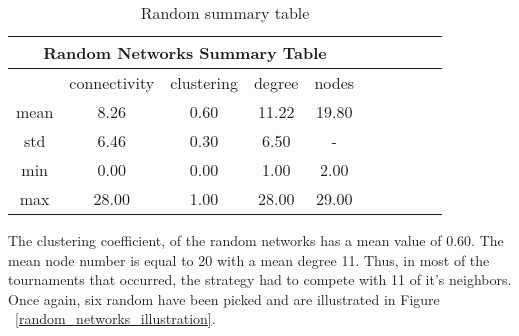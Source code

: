 \begin{table}[H]
	\centering
	\begin{adjustbox}{width=0.5\textwidth}
		\small
		\begin{tabular}{cccccccccc}
				\toprule
			\multicolumn{5}{|c|}{Random Networks Summary Table}                       \\ \hline
			     & connectivity & clustering & degree & nodes                  \\ \hline
			mean & 8.26         & 0.60       & 11.22  & 19.80                  \\ \hline
			std  & 6.46         & 0.30       & 6.50   & \multicolumn{1}{c}{-} \\ \hline
			min  & 0.00         & 0.00       & 1.00   & 2.00                   \\ \hline
			max  & 28.00        & 1.00       & 28.00  & 29.00                  \\ \bottomrule
		\end{tabular}
	\end{adjustbox}
	\caption{Random summary table}
	\label{table:binomial-summary-table}
\end{table}

The clustering coefficient, of the random networks has a mean value of 0.60. The
mean node number is equal to 20 with a mean degree 11. Thus, in most of the
tournaments that occurred, the strategy had to compete with 11 of it's neighbors.
Once again, six random have been picked and are illustrated in Figure ~\ref{random_networks_illustration}.

